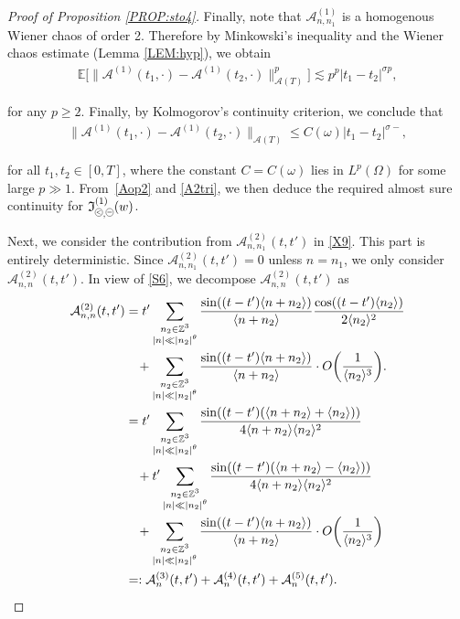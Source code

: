 \documentclass[%
11pt,  reqno]{amsart}
\newcommand{\pe}{\mathbin{\scaleobj{0.7}{\tikz \draw (0,0) node[shape=circle,draw,inner sep=0pt,minimum size=8.5pt] {\scriptsize  $=$};}}}
\newcommand{\pl}{\mathbin{\scaleobj{0.7}{\tikz \draw (0,0) node[shape=circle,draw,inner sep=0pt,minimum size=8.5pt] {\scriptsize $<$};}}}
\newcommand{\1}{\hspace{0.2mm}\text{I}\hspace{0.2mm}}
\newcommand{\noi}{\noindent}
\newcommand{\Z}{\mathbb{Z}}
\newcommand{\E}{\mathbb{E}}
\newcommand{\s}{\sigma}
\renewcommand{\o}{\omega}
\renewcommand{\O}{\Omega}
\newcommand{\les}{\lesssim}
\newcommand{\jb}[1]
{\langle #1 \rangle}
\newcommand{\If}{\mathfrak{I}}
\newcommand{\A}{\mathcal{A}}
\numberwithin{equation}{section}
\numberwithin{theorem}{section}
\begin{document}
\begin{proof}[Proof of Proposition \ref{PROP:sto4}]
Finally, note that 
 $\A^{(1)}_{n, n_1}$ is a homogenous Wiener chaos of order 2.
Therefore by Minkowski's inequality and the Wiener chaos estimate  (Lemma \ref{LEM:hyp}), we obtain 
 \begin{align*}
\E\big[\|\A^{(1)} (t_1, \cdot)-\A^{(1)} (t_2, \cdot)\|_{\A(T)}^p\big] \les 
p^p |t_1-t_2|^{\s p },
\end{align*}

 \noi
for any $p \geq 2$.
 Finally, by Kolmogorov's continuity criterion, 
 we conclude that 
 \begin{align}
  \|\A^{(1)} (t_1, \cdot)-\A^{(1)} (t_2, \cdot)\|_{\A(T)} \le C(\omega) 
 |t_1-t_2|^{\s-},  
\label{A2tri}
 \end{align}
 
 \noi
 for all $t_1,t_2\in[0,T]$,  where the constant $C= C(\o)$ lies in $L^p(\O)$ for some large $p\gg 1$. 
  From~\eqref{Aop2} 
and \eqref{A2tri}, 
we then deduce the required almost sure continuity for $\If_{\pl, \pe}^{(1)}(w)$.


Next, we consider the contribution from 
$ \A^{(2)}_{n, n_1} (t, t')$ in \eqref{X9}.  This part is entirely deterministic.
Since 
$ \A^{(2)}_{n, n_1} (t, t') = 0$ unless $n = n_1$, 
we only consider $ \A^{(2)}_{n, n} (t, t')$.
In view of \eqref{S6}, we decompose $ \A^{(2)}_{n, n} (t, t')$ as
 \begin{align}
 \A^{(2)}_{n, n} (t, t')
&  =  t'\sum_{\substack{n_2 \in \Z^3 \\ |n| \ll |n_2|^\theta}}
 \frac{\sin ((t - t') \jb{n + n_2 })}{\jb{ n + n_2} } 
   \frac{\cos((t - t')\jb{n_2}) }{2 \jb{n_2}^2}  \notag\\
& \hphantom{X}
+ \sum_{\substack{n_2 \in \Z^3 \\ |n| \ll |n_2|^\theta}}
 \frac{\sin ((t - t') \jb{n + n_2 })}{\jb{ n + n_2} } 
 \cdot    O\bigg(\frac{1}{\jb{n_2}^3 }\bigg).
\notag   \\
& = t'    \sum_{\substack{n_2 \in \Z^3 \\ |n| \ll |n_2|^\theta}}
\frac{\sin ((t - t')( \jb{n + n_2 }+ \jb{n_2}))}{4\jb{ n + n_2} \jb{n_2}^2}  \notag\\
& \hphantom{X}
+ t'    \sum_{\substack{n_2 \in \Z^3 \\ |n| \ll |n_2|^\theta}}
 \frac{\sin ((t - t')( \jb{n + n_2 }- \jb{n_2}))}{4\jb{ n + n_2} \jb{n_2}^2}  \notag\\
& \hphantom{X}
+ \sum_{\substack{n_2 \in \Z^3 \\ |n| \ll |n_2|^\theta}}
 \frac{\sin ((t - t') \jb{n + n_2 })}{\jb{ n + n_2} } 
\cdot    O\bigg(\frac{1}{\jb{n_2}^3 }\bigg)\notag\\
& = : 
 \A^{(3)}_{n} (t, t')
 +  \A^{(4)}_{n} (t, t')
 +  \A^{(5)}_{n} (t, t').
 \label{A4a}
\end{align}



\end{proof}
\end{document}
